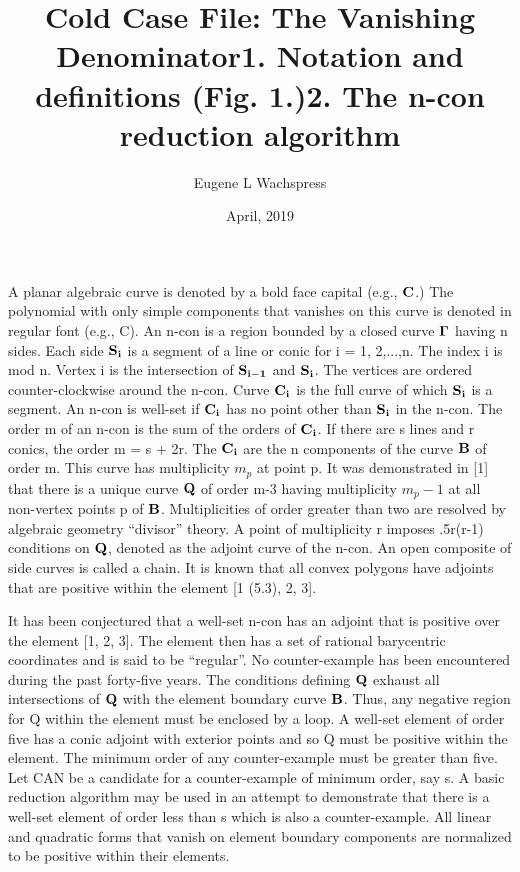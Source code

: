 \documentclass{article}
\title{Cold Case File: The Vanishing Denominator}
\author{ Eugene L Wachspress}
\date {April, 2019}
\begin{document}
\maketitle

\title{1. Notation and definitions (Fig. 1.)}
\par
A planar algebraic curve is denoted by a bold face capital (e.g., $\bf{C}$.)  The polynomial with only simple components that vanishes on this curve is denoted in regular font (e.g., C).
An n-con is a region bounded by a closed curve $\bf{\Gamma}$ having n sides.  Each side $\bf{S}_i$ is a segment of a line or conic for i  = 1, 2,...,n.  The index i is mod n.  Vertex i is the intersection of $\bf{S}_{i-1}$ and $\bf{S}_i$.  The vertices are ordered counter-clockwise around the n-con.  Curve $\bf{C}_i$ is the full curve of which $\bf{S}_i$ is a segment.  An n-con is well-set if $\bf{C}_i$ has no point other than $\bf{S}_i$ in the n-con. The order m of an n-con is the sum of the orders of $\bf{C}_i$.  If there are s lines and r conics, the order m = s + 2r.  The $\bf{C}_i$ are the n components of the curve $\bf{B}$ of order m.  This curve has multiplicity $m_p$ at point p.  It was demonstrated in [1] that there is a unique curve $\bf{Q}$ of order m-3 having multiplicity $m_p - 1$ at all non-vertex points p of $\bf{B}$.  Multiplicities of order greater than two are resolved by algebraic geometry ``divisor'' theory.  A point of multiplicity r imposes .5r(r-1) conditions on $\bf{Q}$, denoted as the adjoint curve of the n-con.   An open composite of side curves is called a chain.  It is known that all convex polygons have adjoints that are positive within the element [1 (5.3), 2, 3].  
\par
\title{2.  The n-con reduction algorithm}
\par
It has been conjectured that a well-set n-con has an adjoint that is positive over the element [1, 2, 3].  The element then has a set of rational barycentric coordinates and is said to be ``regular''.  No counter-example has been encountered during the past forty-five years.  The conditions defining $\bf{Q}$ exhaust all intersections of $\bf{Q}$ with the element boundary curve $\bf{B}$. Thus, any negative region for Q within the element must be enclosed by a loop.   A well-set element of order five has a conic adjoint with exterior points and so Q must be positive within the element.  The minimum order of any counter-example must be greater than five.  Let CAN be a candidate for a counter-example of minimum order, say s.  A basic reduction algorithm may be used in an attempt to demonstrate that there is a well-set element of order less than s which is also a counter-example.  All linear and quadratic forms that vanish on element 
boundary components are normalized to be positive within their elements.
\end{document}
